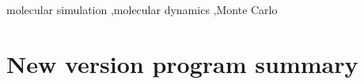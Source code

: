 \documentclass[preprint,12pt]{elsarticle}
\begin{document}
\begin{frontmatter}
\begin{abstract}
\end{abstract}

\begin{keyword}
molecular simulation \sep molecular dynamics \sep Monte Carlo
\end{keyword}

\end{frontmatter}



\section*{New version program summary}
\end{document}
